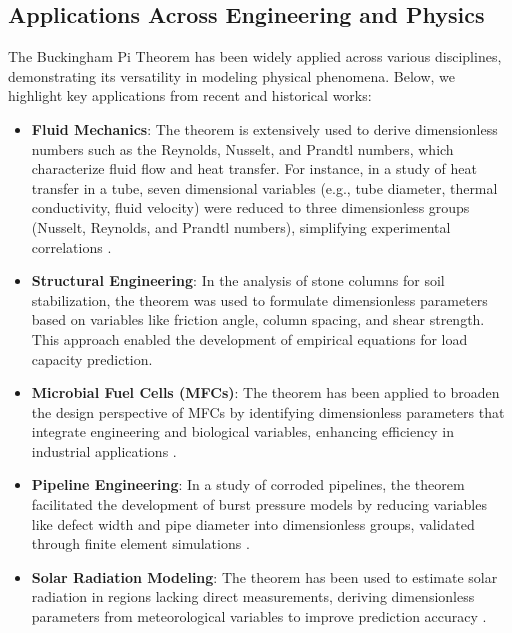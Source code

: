 \documentclass[
	11pt, %
	fleqn, %
	a4paper, %
]{LegrandOrangeBook}
\begin{document}
\subsection{Applications Across Engineering and Physics}

The Buckingham Pi Theorem has been widely applied across various disciplines, demonstrating its versatility in modeling physical phenomena. Below, we highlight key applications from recent and historical works:

\begin{itemize}
    \item \textbf{Fluid Mechanics}: The theorem is extensively used to derive dimensionless numbers such as the Reynolds, Nusselt, and Prandtl numbers, which characterize fluid flow and heat transfer. For instance, in a study of heat transfer in a tube, seven dimensional variables (e.g., tube diameter, thermal conductivity, fluid velocity) were reduced to three dimensionless groups (Nusselt, Reynolds, and Prandtl numbers), simplifying experimental correlations \cite{ScienceDirect2019}.

    \item \textbf{Structural Engineering}: In the analysis of stone columns for soil stabilization, the theorem was used to formulate dimensionless parameters based on variables like friction angle, column spacing, and shear strength. This approach enabled the development of empirical equations for load capacity prediction.

    \item \textbf{Microbial Fuel Cells (MFCs)}: The theorem has been applied to broaden the design perspective of MFCs by identifying dimensionless parameters that integrate engineering and biological variables, enhancing efficiency in industrial applications \cite{ScienceDirect2019}.

    \item \textbf{Pipeline Engineering}: In a study of corroded pipelines, the theorem facilitated the development of burst pressure models by reducing variables like defect width and pipe diameter into dimensionless groups, validated through finite element simulations \cite{AmayaGomez2019}.

    \item \textbf{Solar Radiation Modeling}: The theorem has been used to estimate solar radiation in regions lacking direct measurements, deriving dimensionless parameters from meteorological variables to improve prediction accuracy \cite{ScienceGovSolarRadiation}.
\end{itemize}
\end{document}
